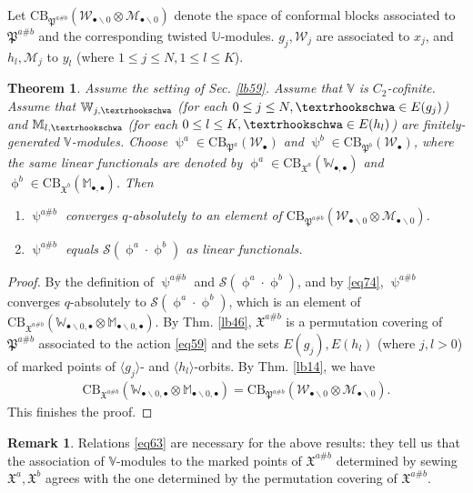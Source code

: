 \documentclass[11pt,b5paper,notitlepage]{article}
\theoremstyle{definition}
\newtheorem{rem}[df]{Remark}
\theoremstyle{plain}
\newtheorem{thm}[df]{Theorem}
\newcommand{\fk}{\mathfrak}
\newcommand{\mc}{\mathcal}
\newcommand{\bk}[1]{\langle {#1}\rangle}
\newcommand{\scr}{\mathscr}
\newcommand{\blt}{\bullet}
\newcommand{\Vbb}{\mathbb V}
\newcommand{\Ubb}{\mathbb U}
\newcommand{\Wbb}{\mathbb W}
\newcommand{\Mbb}{\mathbb M}
\newcommand{\CB}{\mathrm{CB}}
\newcommand{\tipae}{\text{\textrhookschwa}}
\numberwithin{equation}{subsection}
\begin{document}
Let $\CB_{\fk P^{a\#b}}(\mc W_{\blt\backslash0}\otimes\mc M_{\blt\backslash0})$ denote the space of conformal blocks associated to $\fk P^{a\#b}$ and the corresponding twisted $\Ubb$-modules. $g_j,\mc W_j$ are associated to $x_j$, and $h_l,\mc M_j$ to $y_l$ (where $1\leq j\leq N,1\leq l\leq K$).

\begin{thm}\label{lb48}
Assume the setting of Sec. \ref{lb59}. Assume that $\Vbb$ is $C_2$-cofinite. Assume that $\Wbb_{j,\tipae}$ (for each $0\leq j\leq N,\tipae\in E(g_j)$) and $\Mbb_{l,\tipae}$ (for each $0\leq l\leq K,\tipae\in E(h_l)$) are finitely-generated $\Vbb$-modules. Choose $\uppsi^a\in\CB_{\fk P^a}(\mc W_\blt)$ and $\uppsi^b\in\CB_{\fk P^b}(\mc W_\blt)$, where the same linear functionals are denoted by $\upphi^a\in\CB_{\fk X^a}(\Wbb_{\blt,\blt})$ and $\upphi^b\in\CB_{\fk X^b}(\Mbb_{\blt,\blt})$. Then 
\begin{enumerate}[label=(\arabic*)]
\item $\uppsi^{a\#b}$ converges $q$-absolutely to an element of $\CB_{\fk P^{a\#b}}(\mc W_{\blt\backslash0}\otimes\mc M_{\blt\backslash0})$.
\item $\uppsi^{a\#b}$ equals $\scr S(\upphi^a\cdot \upphi^b)$ as linear functionals.
\end{enumerate}
\end{thm}



\begin{proof}
By the definition of $\uppsi^{a\#b}$ and $\scr S(\upphi^a\cdot \upphi^b)$, and by \eqref{eq74}, $\uppsi^{a\#b}$ converges $q$-absolutely to $\scr S(\upphi^a\cdot \upphi^b)$, which is an element of $\CB_{\fk X^{a\#b}}(\Wbb_{\blt\backslash0,\blt}\otimes\Mbb_{\blt\backslash0,\blt})$. By Thm. \ref{lb46}, $\fk X^{a\#b}$ is a permutation covering of $\fk P^{a\#b}$ associated to the action \eqref{eq59} and the sets $E(g_j),E(h_l)$ (where $j,l>0$) of marked points of $\bk{g_j}$- and $\bk{h_l}$-orbits. By Thm. \ref{lb14}, we have
\begin{align}
\CB_{\fk X^{a\#b}}(\Wbb_{\blt\backslash0,\blt}\otimes\Mbb_{\blt\backslash0,\blt})=\CB_{\fk P^{a\#b}}(\mc W_{\blt\backslash0}\otimes\mc M_{\blt\backslash0}).\label{eq75}
\end{align}
This finishes the proof.
\end{proof}


\begin{rem}
Relations \eqref{eq63} are necessary for the above results: they tell us that the association of $\Vbb$-modules to the marked points of $\fk X^{a\#b}$ determined by sewing $\fk X^a,\fk X^b$ agrees with the one determined by the permutation covering of $\fk X^{a\#b}$.
\end{rem}
\end{document}

